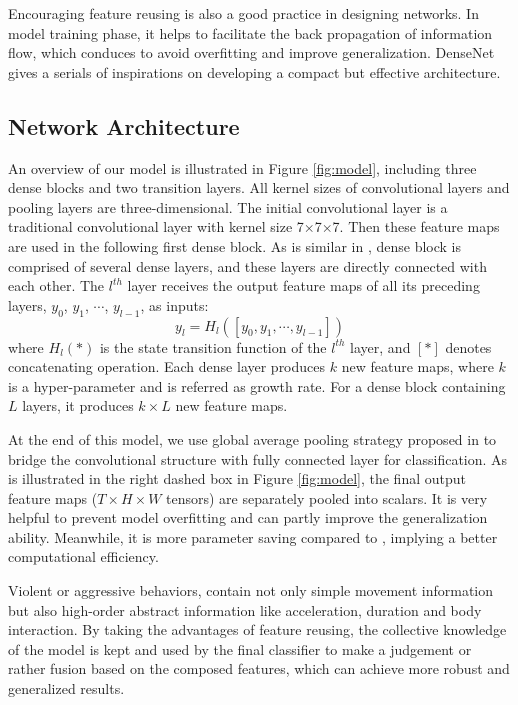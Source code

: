 \documentclass[10pt,twocolumn,letterpaper]{article}
\begin{document}
Encouraging feature reusing is also a good practice in designing networks. In model training phase, it helps to facilitate the back propagation of information flow, which conduces to avoid overfitting and improve generalization. DenseNet \cite{densenet} gives a serials of inspirations on developing a compact but effective architecture.

\subsection{Network Architecture}

An overview of our model is illustrated in Figure \ref{fig:model}, including three dense blocks and two transition layers. 
All kernel sizes of convolutional layers and pooling layers are three-dimensional. 
The initial convolutional layer is a traditional convolutional layer with kernel size 7$\times$7$\times$7. 
Then these feature maps are used in the following first dense block. 
As is similar in \cite{densenet}, dense block is comprised of several dense layers, and these layers are directly connected with each other. 
The $l^{th}$ layer receives the output feature maps of all its preceding layers, $y_0$, $y_1$, $\cdots$, $y_{l-1}$, as inputs:
\begin{equation}
\label{eq:densenet}
y_l = H_l([y_0, y_1, \cdots, y_{l-1}])
\end{equation}
where $H_l(*)$ is the state transition function of the $l^{th}$ layer, and $[*]$ denotes concatenating operation.
Each dense layer produces $k$ new feature maps, where $k$ is a hyper-parameter and is referred as growth rate. For a dense block containing $L$ layers, it produces $k \times L$ new feature maps.

At the end of this model, we use global average pooling strategy proposed in \cite{NinN} to bridge the convolutional structure with fully connected layer for classification.
As is illustrated in the right dashed box in Figure \ref{fig:model}, the final output feature maps ($T \times H \times W$ tensors) are separately pooled into scalars.
It is very helpful to prevent model overfitting and can partly improve the generalization ability. 
Meanwhile, it is more parameter saving compared to , implying a better computational efficiency.

Violent or aggressive behaviors, contain not only simple movement information but also high-order abstract information like acceleration, duration and body interaction. 
By taking the advantages of feature reusing, the collective knowledge of the model is kept and used by the final classifier to make a judgement or rather fusion based on the composed features, which can achieve more robust and generalized results. 
\end{document}
